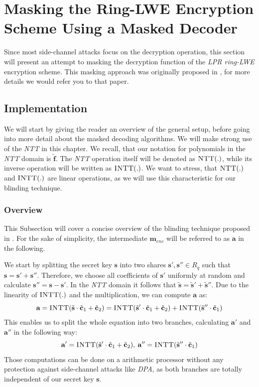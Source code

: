 \chapter{Masking the Ring-LWE Encryption Scheme Using a Masked Decoder}
Since most side-channel attacks focus on the decryption operation, this section will present an attempt to masking the decryption function of the \textit{\ac{LPR} \ac{ring-LWE}} encryption scheme. This masking approach was originally proposed in \cite{maskedRing}, for more details we would refer you to that paper.

\section{Implementation}
We will start by giving the reader an overview of the general setup, before going into more detail about the masked decoding algorithms. We will make strong use of the \textit{\ac{NTT}} in this chapter. We recall, that our notation for polynomials in the \textit{\ac{NTT}} domain is \(\tilde{\textbf{f}}\). The \textit{\ac{NTT}} operation itself will be denoted as \(\textsc{NTT}(.)\), while its inverse operation will be written as \(\textsc{INTT}(.)\). We want to stress, that \(\textsc{NTT}(.)\) and \(\textsc{INTT}(.)\) are linear operations, as we will use this characteristic for our blinding technique.

\subsection{Overview}
This Subsection will cover a concise overview of the blinding technique proposed in \cite{maskedRing}. For the sake of simplicity, the intermediate \(\textbf{m}_{enc}\) will be referred to as \(\textbf{a}\) in the following.

We start by splitting the secret key \(\textbf{s}\) into two shares \(\textbf{s}',\textbf{s}'' \in R_q\) such that \(\textbf{s}=\textbf{s}'+\textbf{s}''\). Therefore, we choose all coefficients of \(\textbf{s}'\) uniformly at random and calculate \(\textbf{s}''=\textbf{s}-\textbf{s}'\). In the \textit{\ac{NTT}} domain it follows that \(\tilde{\textbf{s}}=\tilde{\textbf{s}}'+\tilde{\textbf{s}}''\). Due to the linearity of \(\textsc{INTT}(.)\) and the multiplication, we can compute \(\textbf{a}\) as:
\begin{equation}
	\textbf{a}=\textsc{INTT}(\tilde{\textbf{s}} \cdot \tilde{\textbf{c}}_1+\tilde{\textbf{c}}_2)=\textsc{INTT}(\tilde{\textbf{s}}' \cdot \tilde{\textbf{c}}_1+\tilde{\textbf{c}}_2)+\textsc{INTT}(\tilde{\textbf{s}}'' \cdot \tilde{\textbf{c}}_1)
\end{equation}
This enables us to split the whole equation into two branches, calculating \(\textbf{a}'\) and \(\textbf{a}''\) in the following way:
\begin{equation}
	\textbf{a}'=\textsc{INTT}(\tilde{\textbf{s}}' \cdot \tilde{\textbf{c}}_1+\tilde{\textbf{c}}_2),\:\textbf{a}''=\textsc{INTT}(\tilde{\textbf{s}}'' \cdot \tilde{\textbf{c}}_1)
\end{equation}
Those computations can be done on a arithmetic processor without any protection against side-channel attacks like \textit{\ac{DPA}}, as both branches are totally independent of our secret key \(\textbf{s}\).

